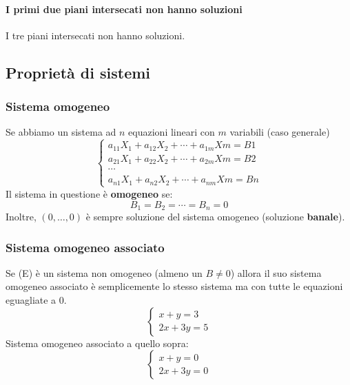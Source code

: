 \documentclass[12pt,a4paper]{article}
\begin{document}
\paragraph{I primi due piani intersecati non hanno soluzioni}
I tre piani intersecati non hanno soluzioni.

\subsection{Proprietà di sistemi}
\subsubsection{Sistema omogeneo}
Se abbiamo un sistema ad $n$ equazioni lineari con $m$ variabili (caso generale)
\[
\begin{cases}
  a_{11}X_1 + a_{12}X_2 + \cdots + a_{1m}Xm = B1\\
  a_{21}X_1 + a_{22}X_2 + \cdots + a_{2m}Xm = B2\\
  \cdots\\
  a_{n1}X_1 + a_{n2}X_2 + \cdots + a_{nm}Xm = Bn
\end{cases}
\]
Il sistema in questione è \textbf{omogeneo} se:
\[
B_1 = B_2 = \cdots = B_n = 0  
\]
Inoltre, $(0,\ldots,0)$ è sempre soluzione del sistema omogeneo (soluzione \textbf{banale}).
\subsubsection{Sistema omogeneo associato}
Se (E) è un sistema non omogeneo (almeno un $B \ne 0$) allora il suo
sistema omogeneo associato è semplicemente lo stesso sistema ma con tutte le equazioni eguagliate a $0$.
\[
\begin{cases}
  x+y = 3\\
  2x + 3y = 5
\end{cases} 
\]
Sistema omogeneo associato a quello sopra:
\[
\begin{cases}
  x+y = 0\\
  2x + 3y = 0
\end{cases} 
\]
\end{document}
